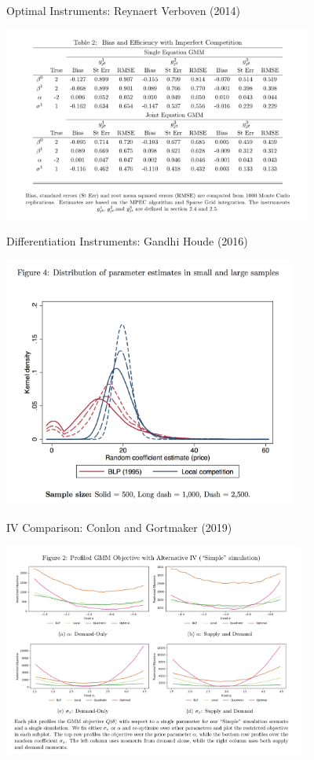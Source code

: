 \documentclass[aspectratio=169,11pt]{beamer}
\begin{document}
\begin{frame}{Optimal Instruments: Reynaert Verboven (2014)}
\begin{center}
\includegraphics[width=4in]{resources/verboven.png}
\end{center}
\end{frame}


\begin{frame}{Differentiation Instruments: Gandhi Houde (2016)}
\begin{center}
\includegraphics[width=3.8in]{resources/d_iv1.png}
\end{center}
\end{frame}


\begin{frame}{IV Comparison: Conlon and Gortmaker (2019)}
\begin{center}
\includegraphics[width=3.9in]{resources/cg_figure.png}
\end{center}
\end{frame}
\end{document}
